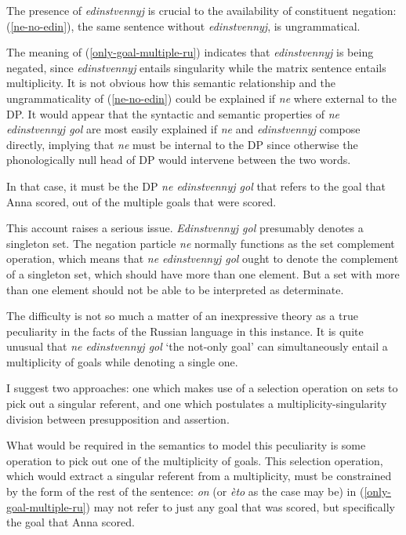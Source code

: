 \documentclass{article}
\begin{document}
The presence of \textit{edinstvennyj} is crucial to the availability of constituent negation: (\ref{ne-no-edin}), the same sentence without \textit{edinstvennyj}, is ungrammatical.

\begin{exe}
\end{exe}

The meaning of (\ref{only-goal-multiple-ru}) indicates that \textit{edinstvennyj} is being negated, since \textit{edinstvennyj} entails singularity while the matrix sentence entails multiplicity. It is not obvious how this semantic relationship and the ungrammaticality of (\ref{ne-no-edin}) could be explained if \textit{ne} where external to the DP. It would appear that the syntactic and semantic properties of \textit{ne edinstvennyj gol} are most easily explained if \textit{ne} and \textit{edinstvennyj} compose directly, implying that \textit{ne} must be internal to the DP since otherwise the phonologically null head of DP would intervene between the two words.

In that case, it must be the DP \textit{ne edinstvennyj gol} that refers to the goal that Anna scored, out of the multiple goals that were scored.

This account raises a serious issue. \textit{Edinstvennyj gol} presumably denotes a singleton set. The negation particle \textit{ne} normally functions as the set complement operation, which means that \textit{ne edinstvennyj gol} ought to denote the complement of a singleton set, which should have more than one element. But a set with more than one element should not be able to be interpreted as determinate.

The difficulty is not so much a matter of an inexpressive theory as a true peculiarity in the facts of the Russian language in this instance. It is quite unusual that \textit{ne edinstvennyj gol} `the not-only goal' can simultaneously entail a multiplicity of goals while denoting a single one.

I suggest two approaches: one which makes use of a selection operation on sets to pick out a singular referent, and one which postulates a multiplicity-singularity division between presupposition and assertion.

What would be required in the semantics to model this peculiarity is some operation to pick out one of the multiplicity of goals. This selection operation, which would extract a singular referent from a multiplicity, must be constrained by the form of the rest of the sentence: \textit{on} (or \textit{\`{e}to}  as the case may be) in (\ref{only-goal-multiple-ru}) may not refer to just any goal that was scored, but specifically the goal that Anna scored.
\end{document}
